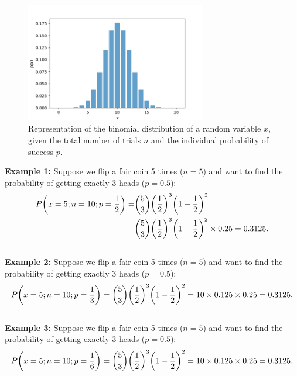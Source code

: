 \documentclass{book}
\begin{document}
\begin{figure}[ht]
    \centering
    \includegraphics[width=0.7\textwidth]{figures/chapter2/binomial.png}
    \caption{Representation of the binomial distribution of a random variable $x$, given the total number of trials $n$ and the individual probability of success $p$.}
    \label{fig:random}
\end{figure}

\textbf{Example 1:} Suppose we flip a fair coin 5 times ($n=5$) and want to find the probability of getting exactly 3 heads ($p=0.5$):
\begin{align}
    P\bigg(x=5; n = 10; p = \frac{1}{2}\bigg) = &\binom{5}{3} \bigg(\frac{1}{2}\bigg)^3 \bigg(1 - \frac{1}{2}\bigg)^2  \notag \\
    &\binom{5}{3} \bigg(\frac{1}{2}\bigg)^3 \bigg(1 - \frac{1}{2}\bigg)^2  \notag \times 0.25 = 0.3125.
\end{align}\\

\textbf{Example 2:} Suppose we flip a fair coin 5 times ($n=5$) and want to find the probability of getting exactly 3 heads ($p=0.5$):
\begin{equation}
    P\bigg(x=5; n = 10; p = \frac{1}{3}\bigg) = \binom{5}{3} \bigg(\frac{1}{2}\bigg)^3 \bigg(1 - \frac{1}{2}\bigg)^2 = 10 \times 0.125 \times 0.25 = 0.3125. \notag
\end{equation}\\

\textbf{Example 3:} Suppose we flip a fair coin 5 times ($n=5$) and want to find the probability of getting exactly 3 heads ($p=0.5$):
\begin{equation}
    P\bigg(x=5; n = 10; p = \frac{1}{6}\bigg) = \binom{5}{3} \bigg(\frac{1}{2}\bigg)^3 \bigg(1 - \frac{1}{2}\bigg)^2 = 10 \times 0.125 \times 0.25 = 0.3125. \notag
\end{equation}\\
\end{document}
